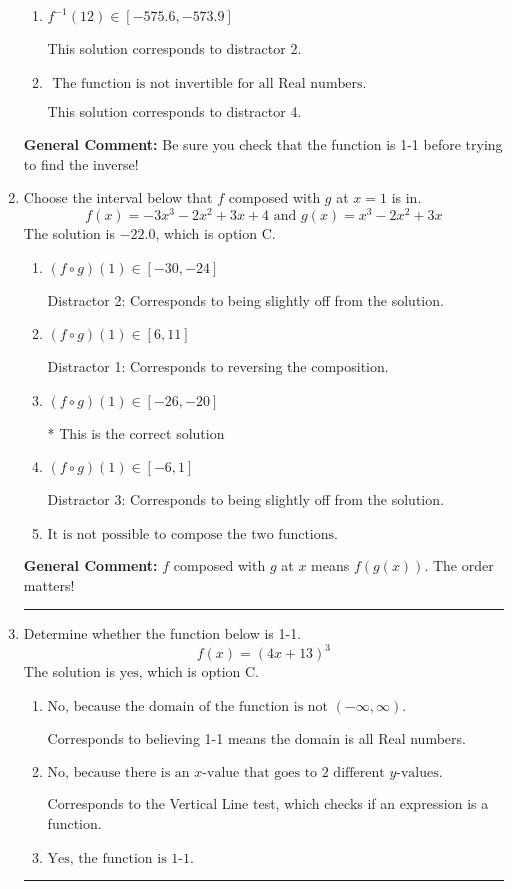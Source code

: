 \documentclass{extbook}[14pt]
\newcommand{\litem}[1]{\item #1

\rule{\textwidth}{0.4pt}}
\begin{document}
\begin{enumerate}
{\begin{enumerate}[label=\Alph*.]
 This solution corresponds to distractor 3.
\item \( f^{-1}(12) \in [-575.6, -573.9] \)

 This solution corresponds to distractor 2.
\item \( \text{ The function is not invertible for all Real numbers. } \)

 This solution corresponds to distractor 4.
\end{enumerate}

\textbf{General Comment:} Be sure you check that the function is 1-1 before trying to find the inverse!
}
\litem{
Choose the interval below that $f$ composed with $g$ at $x=1$ is in.
\[ f(x) = -3x^{3} -2 x^{2} +3 x + 4 \text{ and } g(x) = x^{3} -2 x^{2} +3 x \]The solution is \( -22.0 \), which is option C.\begin{enumerate}[label=\Alph*.]
\item \( (f \circ g)(1) \in [-30, -24] \)

 Distractor 2: Corresponds to being slightly off from the solution.
\item \( (f \circ g)(1) \in [6, 11] \)

 Distractor 1: Corresponds to reversing the composition.
\item \( (f \circ g)(1) \in [-26, -20] \)

* This is the correct solution
\item \( (f \circ g)(1) \in [-6, 1] \)

 Distractor 3: Corresponds to being slightly off from the solution.
\item \( \text{It is not possible to compose the two functions.} \)


\end{enumerate}

\textbf{General Comment:} $f$ composed with $g$ at $x$ means $f(g(x))$. The order matters!
}
\litem{
Determine whether the function below is 1-1.
\[ f(x) = (4 x + 13)^3 \]The solution is \( \text{yes} \), which is option C.\begin{enumerate}[label=\Alph*.]
\item \( \text{No, because the domain of the function is not $(-\infty, \infty)$.} \)

Corresponds to believing 1-1 means the domain is all Real numbers.
\item \( \text{No, because there is an $x$-value that goes to 2 different $y$-values.} \)

Corresponds to the Vertical Line test, which checks if an expression is a function.
\item \( \text{Yes, the function is 1-1.} \)


\end{enumerate}}
\end{enumerate}
\end{document}
